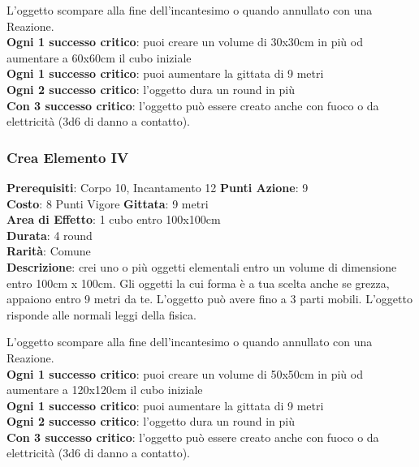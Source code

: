 \documentclass[12pt,a4paper,twoside,openany]{book}
\begin{document}
\begin{multicols}{2}
L'oggetto scompare alla fine dell'incantesimo o quando annullato con una Reazione.\\
\textbf{Ogni 1 successo critico}: puoi creare un volume di 30x30cm in più od aumentare a 60x60cm il cubo iniziale\\
\textbf{Ogni 1 successo critico}: puoi aumentare la gittata di 9 metri\\
\textbf{Ogni 2 successo critico}: l'oggetto dura un round in più\\
\textbf{Con 3 successo critico}: l'oggetto può essere creato anche con fuoco o da elettricità (3d6 di danno a contatto).


\subsubsection*{Crea Elemento IV}
\textbf{Prerequisiti}: Corpo 10, Incantamento 12
\textbf{Punti Azione}: 9\\
\textbf{Costo}: 8 Punti Vigore
\textbf{Gittata}: 9 metri\\
\textbf{Area di Effetto}: 1 cubo entro 100x100cm\\
\textbf{Durata}: 4 round\\
\textbf{Rarità}: Comune\\
\textbf{Descrizione}: crei uno o più oggetti elementali entro un volume di dimensione entro 100cm x 100cm.
Gli oggetti la cui forma è a tua scelta anche se grezza, appaiono entro 9 metri da te. 
L'oggetto può avere fino a 3 parti mobili. L'oggetto risponde alle normali leggi della fisica.

L'oggetto scompare alla fine dell'incantesimo o quando annullato con una Reazione.\\
\textbf{Ogni 1 successo critico}: puoi creare un volume di 50x50cm in più od aumentare a 120x120cm il cubo iniziale\\
\textbf{Ogni 1 successo critico}: puoi aumentare la gittata di 9 metri\\
\textbf{Ogni 2 successo critico}: l'oggetto dura un round in più\\
\textbf{Con 3 successo critico}: l'oggetto può essere creato anche con fuoco o da elettricità (3d6 di danno a contatto).


\end{multicols}
\end{document}
